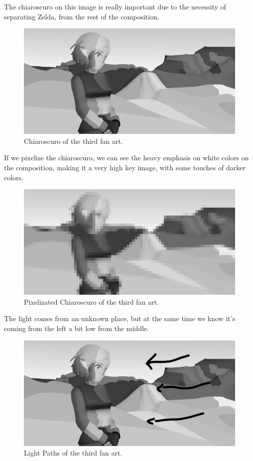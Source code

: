 \documentclass{cup-pan}
\begin{document}
            The chiaroscuro on this image is really important due to the necessity of separating Zelda, from the rest of the composition.
            \begin{figure}[H]
                \includegraphics[width=\textwidth]{Fanart3/0_Analisi/claroscuro.png}
                \caption{Chiaroscuro of the third fan art.}
            \end{figure}

            If we pixelize the chiaroscuro, we can see the heavy emphasis on white colors on the composition, making it a very high key image, with some touches of darker colors. 
            \begin{figure}[H]
                \includegraphics[width=\textwidth]{Fanart3/0_Analisi/pixelize.png}
                \caption{Pixelizated Chiaroscuro of the third fan art.}
            \end{figure}

            The light comes from an unknown place, but at the same time we know it's coming from the left a bit low from the middle. 
            \begin{figure}[H]
                \includegraphics[width=\textwidth]{Fanart3/0_Analisi/light path.png}
                \caption{Light Paths of the third fan art.}
            \end{figure}
\end{document}
